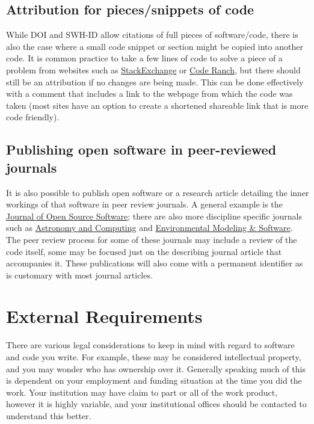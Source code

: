 \documentclass[
  letterpaper,
  DIV=11,
  numbers=noendperiod]{scrreport}
\begin{document}
\hypertarget{attribution-for-piecessnippets-of-code}{%
\subsection{Attribution for pieces/snippets of
code}\label{attribution-for-piecessnippets-of-code}}

While DOI and SWH-ID allow citations of full pieces of software/code,
there is also the case where a small code snippet or section might be
copied into another code. It is common practice to take a few lines of
code to solve a piece of a problem from websites such as
\href{https://stackexchange.com/}{StackExchange} or
\href{https://coderanch.com/}{Code Ranch}, but there should still be an
attribution if no changes are being made. This can be done effectively
with a comment that includes a link to the webpage from which the code
was taken (most sites have an option to create a shortened shareable
link that is more code friendly).

\hypertarget{publishing-open-software-in-peer-reviewed-journals}{%
\subsection{Publishing open software in peer-reviewed
journals}\label{publishing-open-software-in-peer-reviewed-journals}}

It is also possible to publish open software or a research article
detailing the inner workings of that software in peer review journals. A
general example is the \href{https://joss.theoj.org/}{Journal of Open
Source Software}; there are also more discipline specific journals such
as
\href{https://www.journals.elsevier.com/astronomy-and-computing}{Astronomy
and Computing} and
\href{https://www.sciencedirect.com/journal/environmental-modelling-and-software}{Environmental
Modeling \& Software}. The peer review process for some of these
journals may include a review of the code itself, some may be focused
just on the describing journal article that accompanies it. These
publications will also come with a permanent identifier as is customary
with most journal articles.

\hypertarget{external-requirements}{%
\section{External Requirements}\label{external-requirements}}

There are various legal considerations to keep in mind with regard to
software and code you write. For example, these may be considered
intellectual property, and you may wonder who has ownership over it.
Generally speaking much of this is dependent on your employment and
funding situation at the time you did the work. Your institution may
have claim to part or all of the work product, however it is highly
variable, and your institutional offices should be contacted to
understand this better.
\end{document}
